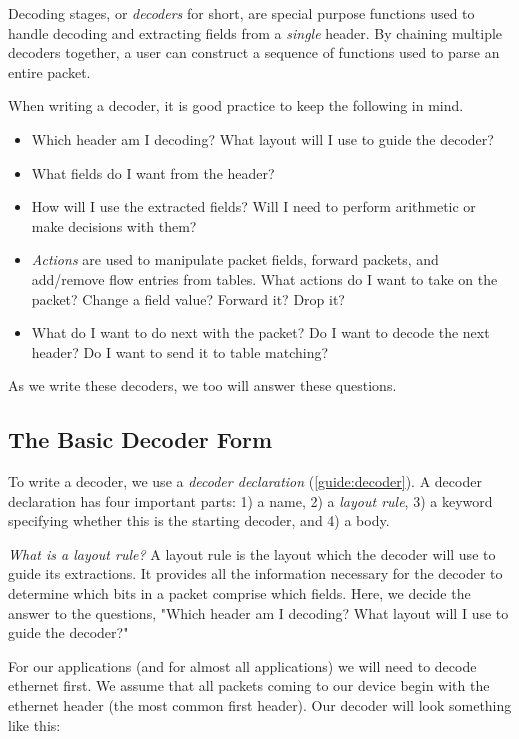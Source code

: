 Decoding stages, or \textit{decoders} for short, are special purpose functions used to handle decoding and extracting fields from a \textit{single} header. By chaining multiple decoders together, a user can construct a sequence of functions used to parse an entire packet.

When writing a decoder, it is good practice to keep the following in mind.

\begin{itemize}
\item Which header am I decoding? What layout will I use to guide the decoder?

\item What fields do I want from the header?

\item How will I use the extracted fields? Will I need to perform arithmetic or make decisions with them?

\item \textit{Actions} are used to manipulate packet fields, forward packets, and add/remove flow entries from tables. What actions do I want to take on the packet? Change a field value? Forward it? Drop it?

\item What do I want to do next with the packet? Do I want to decode the next header? Do I want to send it to table matching?
\end{itemize}

As we write these decoders, we too will answer these questions.

\subsection{The Basic Decoder Form} \label{tut:basic_decoder}

To write a decoder, we use a \textit{decoder declaration} (\ref{guide:decoder}). A decoder declaration has four important parts: 1) a name, 2) a \textit{layout rule}, 3) a keyword specifying whether this is the starting decoder, and 4) a body.

\textit{What is a layout rule?} A layout rule is the layout which the decoder will use to guide its extractions. It provides all the information necessary for the decoder to determine which bits in a packet comprise which fields. Here, we decide the answer to the questions, "Which header am I decoding? What layout will I use to guide the decoder?"

For our applications (and for almost all applications) we will need to decode ethernet first. We assume that all packets coming to our device begin with the ethernet header (the most common first header). Our decoder will look something like this:

